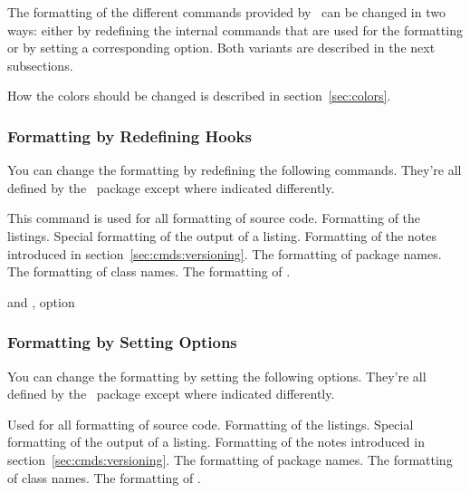 \documentclass[load-preamble]{cnltx-doc}
\begin{document}
The formatting of the different commands provided by \cnltx\ can be
changed in two ways: either by redefining the internal commands that are used
for the formatting or by setting a corresponding option.  Both variants are
described in the next subsections.

How the colors should be changed is described in section~\ref{sec:colors}.

\subsubsection{Formatting by Redefining Hooks}

You can change the formatting by redefining the following commands.  They're
all defined by the \cnltx\ package except where indicated differently.

\begin{commands}
    This command is used for all formatting of source code.
    Formatting of the listings.
  \Default
    Special formatting of the output of a listing.
    \byclass Formatting of the notes introduced in section~\ref{sec:cmds:versioning}.
    The formatting of package names.
    The formatting of class names.
    The formatting of .
\end{commands}

\begin{example}
  \renewcommand*\codefont{\sffamily\bfseries}
   and , option 
\end{example}

\subsubsection{Formatting by Setting Options}

You can change the formatting by setting the following options.  They're all
defined by the \cnltx\ package except where indicated differently.

\begin{options}
    Used for all formatting of source code.
    Formatting of the listings.
  \Default
    Special formatting of the output of a listing.
    \byclass Formatting of the notes introduced in
    section~\ref{sec:cmds:versioning}.
    The formatting of package names.
    The formatting of class names.
    The formatting of .
\end{options}
\end{document}
